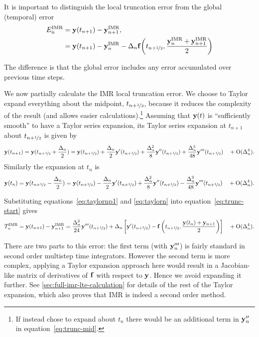 It is important to distinguish the local truncation error from the global (temporal) error
\begin{equation}
  \label{eq:global-temporal-error}
  \begin{aligned}
    E_n^\imr &= \yv(t_{n+1}) - \yv_{n+1}^\imr, \\
    &=  \yv(t_{n+1}) - \yv_n^\imr - \dtn \fv\bigb{ \thf, \frac{\yv_n^\imr + \yv_{n+1}^\imr}{2} }
  \end{aligned}
\end{equation}


The difference is that the global error includes any error accumulated over previous time steps.

We now partially calculate the IMR local truncation error.
We choose to Taylor expand everything about the midpoint, $t_{n+\nicefrac{1}{2}}$, because it reduces the complexity of the result (and allows easier calculations).\footnote{If instead chose to expand about $t_n$ there would be an additional term in $\mathbf{y}_n''$ in equation~\eqref{eq:trunc-mid}.}
Assuming that $\mathbf{y}(t)$ is ``sufficiently smooth'' to have a Taylor series expansion, its Taylor series expansion at $t_{n+1}$ about $t_{n+\nicefrac{1}{2}}$ is given by
\begin{equation}
  \yv(t_{n+1}) = \yv(\thf + \frac{\dtn}{2}) = \yvhf + \frac{\dtn}{2} \yvhf['] + \frac{\dtn^2}{8} \yvhf[''] + \frac{\dtn^3}{48} \yvhf['''] \porder{\dtn^4}.
  \label{eq:taylornp1}
\end{equation}
Similarly the expansion at $t_n$ is
\begin{equation}
  \yv(t_n) = \yv(\thf - \frac{\dtn}{2}) = \yvhf - \frac{\dtn}{2} \yvhf['] + \frac{\dtn^2}{8} \yvhf[''] - \frac{\dtn^3}{48} \yvhf['''] \porder{\dtn^4}.
  \label{eq:taylorn}
\end{equation}

Substituting equations~\eqref{eq:taylornp1} and \eqref{eq:taylorn} into equation~\eqref{eq:trunc-start} gives
\begin{equation}
  \lte^\imr = \yv(t_{n+1}) - \yv_{n+1}^\imr
  = \frac{\dtn^3}{24} \yvhf[''']  + \dtn  \left[ \yvhf[']
    - \fv\left( \thf, \frac{\yv(t_n) + \yv_{n+1}}{2} \right) \right]  \porder{\dtn^4}.
  \label{eq:trunc-mid}
\end{equation}

There are two parts to this error: the first term (with $\mathbf{y}'''_n$) is fairly standard in second order multistep time integrators.
However the second term is more complex, applying a Taylor expansion approach here would result in a Jacobian-like matrix of derivatives of ${\mathbf{f}}$ with respect to $\mathbf{y}$.
Hence we avoid expanding it further.
See \autoref{sec:full-imr-lte-calculation} for details of the rest of the Taylor expansion, which also proves that IMR is indeed a second order method.

